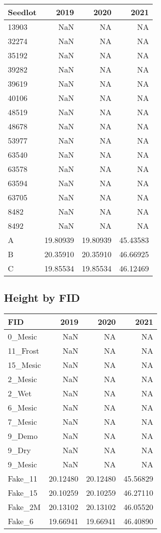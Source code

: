 \documentclass[
]{article}
\begin{document}
\begin{tabular}{l|r|r|r}
\hline
Seedlot & 2019 & 2020 & 2021\\
\hline
13903 & NaN & NA & NA\\
\hline
32274 & NaN & NA & NA\\
\hline
35192 & NaN & NA & NA\\
\hline
39282 & NaN & NA & NA\\
\hline
39619 & NaN & NA & NA\\
\hline
40106 & NaN & NA & NA\\
\hline
48519 & NaN & NA & NA\\
\hline
48678 & NaN & NA & NA\\
\hline
53977 & NaN & NA & NA\\
\hline
63540 & NaN & NA & NA\\
\hline
63578 & NaN & NA & NA\\
\hline
63594 & NaN & NA & NA\\
\hline
63705 & NaN & NA & NA\\
\hline
8482 & NaN & NA & NA\\
\hline
8492 & NaN & NA & NA\\
\hline
A & 19.80939 & 19.80939 & 45.43583\\
\hline
B & 20.35910 & 20.35910 & 46.66925\\
\hline
C & 19.85534 & 19.85534 & 46.12469\\
\hline
\end{tabular}

\hypertarget{height-by-fid-1}{%
\subsection{Height by FID}\label{height-by-fid-1}}

\begin{tabular}{l|r|r|r}
\hline
FID & 2019 & 2020 & 2021\\
\hline
0\_Mesic & NaN & NA & NA\\
\hline
11\_Frost & NaN & NA & NA\\
\hline
15\_Mesic & NaN & NA & NA\\
\hline
2\_Mesic & NaN & NA & NA\\
\hline
2\_Wet & NaN & NA & NA\\
\hline
6\_Mesic & NaN & NA & NA\\
\hline
7\_Mesic & NaN & NA & NA\\
\hline
9\_Demo & NaN & NA & NA\\
\hline
9\_Dry & NaN & NA & NA\\
\hline
9\_Mesic & NaN & NA & NA\\
\hline
Fake\_11 & 20.12480 & 20.12480 & 45.56829\\
\hline
Fake\_15 & 20.10259 & 20.10259 & 46.27110\\
\hline
Fake\_2M & 20.13102 & 20.13102 & 46.05520\\
\hline
Fake\_6 & 19.66941 & 19.66941 & 46.40890\\
\hline
\end{tabular}
\end{document}
